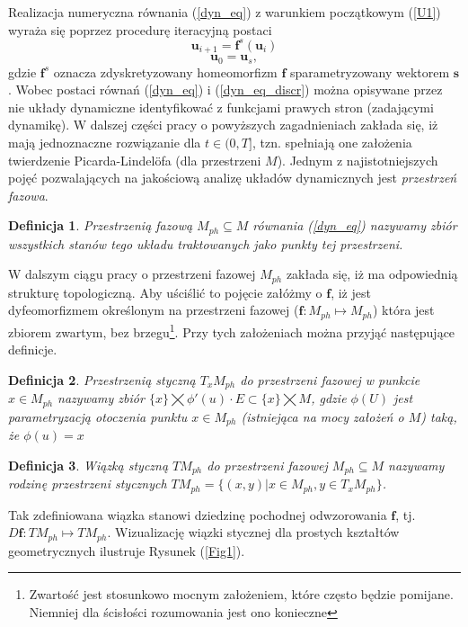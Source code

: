 \documentclass[12pt]{article}
\newtheorem{defi}{Definicja}
\begin{document}
Realizacja numeryczna równania (\ref{dyn_eq}) z warunkiem początkowym (\ref{U1}) wyraża się poprzez procedurę iteracyjną postaci
\begin{equation}
\textbf{u}_{i+1} = \textbf{f}^{s}(\textbf{u}_{i})
\label{dyn_eq_discr}
\end{equation}
\begin{equation}
\textbf{u}_{0} = \textbf{u}_{s},
\label{U2}
\end{equation}
gdzie $ \textbf{f}^{s} $ oznacza zdyskretyzowany homeomorfizm $ \textbf{f} $ sparametryzowany wektorem $ \textbf{s} $. Wobec postaci równań (\ref{dyn_eq}) i (\ref{dyn_eq_discr}) można opisywane przez nie układy dynamiczne identyfikować z funkcjami prawych stron (zadającymi dynamikę). W dalszej części pracy o powyższych zagadnieniach zakłada się, iż mają jednoznaczne rozwiązanie dla  $t\in(0,T]$, tzn. spełniają one założenia twierdzenie Picarda-Lindelöfa (dla przestrzeni $ M $). Jednym z najistotniejszych pojęć pozwalających na jakościową analizę układów dynamicznych jest \textit{przestrzeń fazowa}.
\begin{defi}\label{ph_space}
	Przestrzenią fazową $M_{ph} \subseteq M $ równania (\ref{dyn_eq}) nazywamy zbiór wszystkich stanów tego układu traktowanych jako punkty tej przestrzeni.
\end{defi}
W dalszym ciągu pracy o przestrzeni fazowej $ M_{ph} $ zakłada się, iż ma odpowiednią strukturę topologiczną. Aby uściślić to pojęcie załóżmy o $ \textbf{f} $, iż jest dyfeomorfizmem określonym na przestrzeni fazowej ($  \textbf{f}: M_{ph} \mapsto M_{ph}$) która jest zbiorem zwartym, bez brzegu\footnote{Zwartość jest stosunkowo mocnym założeniem, które często będzie pomijane. Niemniej dla ścisłości rozumowania jest ono konieczne}. Przy tych założeniach można przyjąć następujące definicje. 
\begin{defi}\label{tan_space}
	Przestrzenią styczną $ T_{x}M_{ph} $ do przestrzeni fazowej w punkcie $ x\in M_{ph} $ nazywamy zbiór $ \{x\} \bigtimes \phi'(u)\cdot E \subset \{x\}\bigtimes M$, gdzie $ \phi (U) $ jest parametryzacją otoczenia punktu $ x\in M_{ph} $ (istniejąca na mocy założeń o $ M $) taką, że $ \phi (u) = x $
\end{defi}
\begin{defi}\label{tan_bundle}
	Wiązką styczną $ TM_{ph} $ do przestrzeni fazowej $M_{ph} \subseteq M $ nazywamy rodzinę przestrzeni stycznych $  TM_{ph} = \{ (x,y) | x \in M_{ph} , y \in T_{x} M_{ph}\} $.
\end{defi}
Tak zdefiniowana wiązka stanowi dziedzinę pochodnej odwzorowania $ \textbf{f} $, tj. $ D\textbf{f}:TM_{ph} \mapsto TM_{ph}  $. Wizualizację wiązki stycznej dla prostych kształtów geometrycznych ilustruje Rysunek (\ref{Fig1}).
\end{document}
